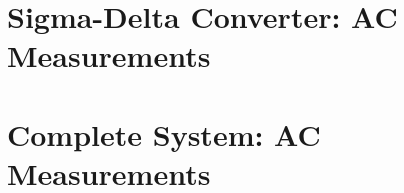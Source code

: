 \section{Sigma-Delta Converter: AC Measurements}
\label{sec:sigdelAC}

\section{Complete System: AC Measurements}
\label{sec:systemAC}


